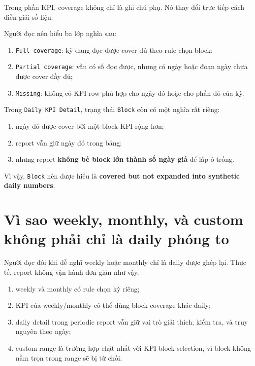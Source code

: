 Trong phần KPI, coverage không chỉ là ghi chú phụ. Nó thay đổi trực tiếp cách diễn giải số liệu.

Người đọc nên hiểu ba lớp nghĩa sau:

\begin{enumerate}[label=-]
\item \texttt{Full coverage}: kỳ đang đọc được cover đủ theo rule chọn block;
\item \texttt{Partial coverage}: vẫn có số đọc được, nhưng có ngày hoặc đoạn ngày chưa được cover đầy đủ;
\item \texttt{Missing}: không có KPI row phù hợp cho ngày đó hoặc cho phần đó của kỳ.
\end{enumerate}

Trong \texttt{Daily KPI Detail}, trạng thái \texttt{Block} còn có một nghĩa rất riêng:

\begin{enumerate}[label=-]
\item ngày đó được cover bởi một block KPI rộng hơn;
\item report vẫn giữ ngày đó trong bảng;
\item nhưng report \textbf{không bẻ block lớn thành số ngày giả} để lấp ô trống.
\end{enumerate}

Vì vậy, \texttt{Block} nên được hiểu là \textbf{covered but not expanded into synthetic daily numbers}.

\section{Vì sao weekly, monthly, và custom không phải chỉ là daily phóng to}

Người đọc đôi khi dễ nghĩ weekly hoặc monthly chỉ là daily được ghép lại. Thực tế, report không vận hành đơn giản như vậy.

\begin{enumerate}[label=-]
\item weekly và monthly có rule chọn kỳ riêng;
\item KPI của weekly/monthly có thể dùng block coverage khác daily;
\item daily detail trong periodic report vẫn giữ vai trò giải thích, kiểm tra, và truy nguyên theo ngày;
\item custom range là trường hợp chặt nhất với KPI block selection, vì block không nằm trọn trong range sẽ bị từ chối.
\end{enumerate}

